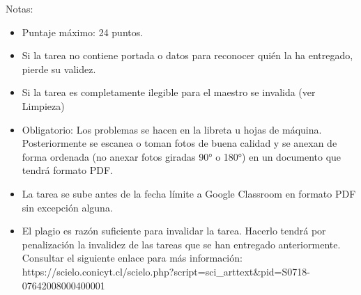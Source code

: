\documentclass[11pt,article,landscape]{memoir}
\begin{document}
Notas:\\
\begin{itemize}
    \item Puntaje máximo: 24 puntos.
    \item Si la tarea no contiene portada o datos para reconocer quién la ha entregado, pierde su validez.
    \item Si la tarea es completamente ilegible para el maestro se invalida (ver Limpieza)
    \item Obligatorio: Los problemas se hacen en la libreta u hojas de máquina. Posteriormente se escanea o toman fotos de buena calidad y se anexan de forma ordenada (no anexar fotos giradas 90° o 180°) en un documento que tendrá formato PDF.
    \item La tarea se sube antes de la fecha límite a Google Classroom en formato PDF sin excepción alguna.
    \item El plagio es razón suficiente para invalidar la tarea. Hacerlo tendrá por penalización la invalidez de las tareas que se han entregado anteriormente. Consultar el siguiente enlace para más información: https://scielo.conicyt.cl/scielo.php?script=sci\_arttext\&pid=S0718-07642008000400001
\end{itemize}
\end{document}
